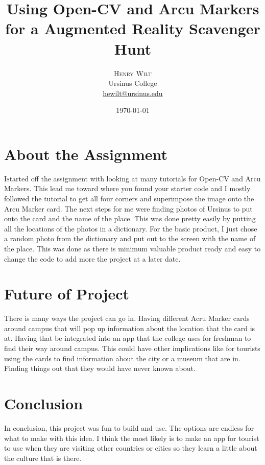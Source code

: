 \documentclass[twoside,twocolumn]{article}
\title{Using Open-CV and Arcu Markers for a Augmented Reality Scavenger Hunt} %
\author{%
\textsc{Henry Wilt} \\[1ex]%
\normalsize Ursinus College \\ %
\normalsize \href{mailto:hewilt@ursinus.edu}{hewilt@ursinus.edu} %
}
\date{\today} %
\begin{document}
\maketitle


\section{About the Assignment}

\lettrine[nindent=0em,lines=2]{I} started off the assignment with looking at many tutorials for Open-CV and Arcu Markers\cite{assignmentgithub}. This lead me toward where you found your starter code and I mostly followed the tutorial to get all four corners and superimpose the image onto the Arcu Marker card. The next steps for me were finding photos of Ursinus to put onto the card and the name of the place. This was done pretty easily by putting all the locations of the photos in a dictionary. For the basic product, I just chose a random photo from the dictionary and put out to the screen with the name of the place. This was done as there is minimum valuable product ready and easy to change the code to add more the project at a later date.


\section{Future of Project}
There is many ways the project can go in. Having different Acru Marker cards around campus that will pop up information about the location that the card is at. Having that be integrated into an app that the college uses for freshman to find their way around campus. This could have other implications like for tourists using the cards to find information about the city or a museum that are in. Finding things out that they would have never known about. 



\section{Conclusion}
In conclusion, this project was fun to build and use. The options are endless for what to make with this idea. I think the most likely is to make an app for tourist to use when they are visiting other countries or cities so they learn a little about the culture that is there. 


\printbibliography %

\end{document}
